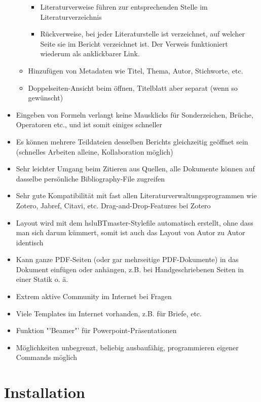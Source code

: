 \begin{itemize}
\begin{itemize}
\begin{itemize}
\item Literaturverweise führen zur entsprechenden Stelle im Literaturverzeichnis%
\item Rückverweise, bei jeder Literaturstelle ist verzeichnet, auf welcher Seite sie im Bericht verzeichnet ist. Der Verweis funktioniert wiederum als anklickbarer Link.%
\end{itemize}
\item Hinzufügen von Metadaten wie Titel, Thema, Autor, Stichworte, etc.%
\item Doppelseiten-Ansicht beim öffnen, Titelblatt aber separat (wenn so gewünscht)%
\end{itemize} 
%
\item Eingeben von Formeln verlangt keine Mausklicks für Sonderzeichen, Brüche, Operatoren etc., und ist somit einiges schneller%
\item Es können mehrere Teildateien desselben Berichts gleichzeitig geöffnet sein (schnelles Arbeiten alleine, Kollaboration möglich)%
\item Sehr leichter Umgang beim Zitieren aus Quellen, alle Dokumente können auf dasselbe persönliche Bibliography-File zugreifen%
\item Sehr gute Kompatibilität mit fast allen Literaturverwaltungsprogrammen wie Zotero, Jabref, Citavi, etc. Drag-and-Drop-Features bei Zotero%
\item Layout wird mit dem hsluBTmaster-Stylefile automatisch erstellt, ohne dass man sich darum kümmert, somit ist auch das Layout von Autor zu Autor identisch%
\item Kann ganze PDF-Seiten (oder gar mehrseitige PDF-Dokumente) in das Dokument einfügen oder anhängen, z.B. bei Handgeschriebenen Seiten in einer Statik o. ä.%
\item Extrem aktive Community im Internet bei Fragen%
\item Viele Templates im Internet vorhanden, z.B. für Briefe, etc.%
\item Funktion "'Beamer"' für Powerpoint-Präsentationen%
\item Möglichkeiten unbegrenzt, beliebig ausbaufähig, programmieren eigener Commands möglich%
\end{itemize}
%
%
%
%
%
%
\section{Installation}
%
